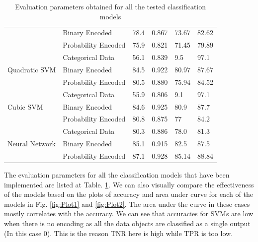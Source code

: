 \documentclass{article} %
\begin{document}
\begin{table}[H]
{\begin{tabular}{|l|l|l|l|l|l|}
				& Binary Encoded                                             & 78.4             & 0.867            & 73.67       & 82.62      \\ \cline{2-6} 
				& Probability Encoded                                        & 75.9             & 0.821            & 71.45       & 79.89      \\ \hline
				\multirow{3}{*}{Quadratic SVM}                                   & Categorical Data                                           & 56.1             & 0.839            & 9.5         & 97.1       \\ \cline{2-6} 
				& Binary Encoded                                             & 84.5             & 0.922            & 80.97       & 87.67      \\ \cline{2-6} 
				& Probability Encoded                                        & 80.5             & 0.880            & 75.94       & 84.52      \\ \hline
				\multirow{3}{*}{Cubic SVM}                                       & Categorical Data                                           & 55.9             & 0.806            & 9.1         & 97.1       \\ \cline{2-6} 
				& Binary Encoded                                             & 84.6             & 0.925            & 80.9        & 87.7       \\ \cline{2-6} 
				& Probability Encoded                                        & 80.8             & 0.875            & 77          & 84.2       \\ \hline
				\multirow{3}{*}{Neural Network}                                  & Categorical Data                                           & 80.3             & 0.886            & 78.0        & 81.3       \\ \cline{2-6} 
				& Binary Encoded                                             & 85.1             & 0.915            & 82.5        & 87.5       \\ \cline{2-6} 
				& Probability Encoded                                        & 87.1             & 0.928            & 85.14       & 88.84      \\ \hline
			\end{tabular}
		}
		\caption{Evaluation parameters obtained for all the tested classification models}
		\label{table:Table1}
	\end{table}
	
	The evaluation parameters for all the classification models that have been implemented are listed at Table. \ref{table:Table1}. We can also visually compare the effectiveness of the models based on the plots of accuracy and area under curve for each of the models in  Fig. \ref{fig:Plot1} and \ref{fig:Plot2}. The area under the curve in these cases mostly correlates with the accuracy. We can see that accuracies for SVMs are low when there is no encoding as all the data objects are classified as a single output (In this case 0). This is the reason TNR here is high while TPR is too low. 	
	
\end{document}
